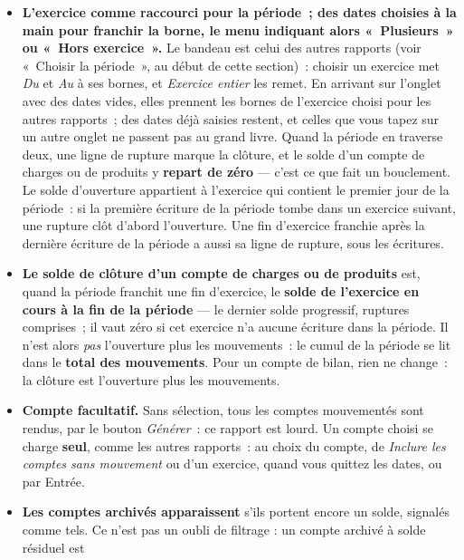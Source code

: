 \documentclass[a4paper,11pt,oneside]{article}
\begin{document}
\begin{itemize}
    \item \textbf{L'exercice comme raccourci pour la période~; des dates choisies à la main pour
          franchir la borne, le menu indiquant alors «~Plusieurs~» ou «~Hors exercice~».} Le bandeau
          est celui des autres rapports (voir «~Choisir la période~», au début de cette section)~:
          choisir un exercice met \emph{Du} et \emph{Au} à ses bornes, et \emph{Exercice entier}
          les remet. En arrivant sur l'onglet avec des dates vides, elles prennent les bornes de
          l'exercice choisi pour les autres rapports~; des dates déjà saisies restent, et celles
          que vous tapez sur un autre onglet ne passent pas au grand livre. Quand la période en traverse deux, une
          ligne de rupture marque la clôture, et le solde d'un compte de charges ou de produits
          y \textbf{repart de zéro} — c'est ce que fait un bouclement. Le solde d'ouverture
          appartient à l'exercice qui contient le premier jour de la période~: si la première
          écriture de la période tombe dans un exercice suivant, une rupture clôt d'abord
          l'ouverture. Une fin d'exercice franchie après la dernière écriture de la période a
          aussi sa ligne de rupture, sous les écritures.
    \item \textbf{Le solde de clôture d'un compte de charges ou de produits} est, quand la
          période franchit une fin d'exercice, le \textbf{solde de l'exercice en cours à la fin
          de la période} --- le dernier solde progressif, ruptures comprises~; il vaut zéro si
          cet exercice n'a aucune écriture dans la période. Il n'est alors \emph{pas} l'ouverture
          plus les mouvements~: le cumul de la période se lit dans le \textbf{total des
          mouvements}. Pour un compte de bilan, rien ne change~: la clôture est l'ouverture plus
          les mouvements.
    \item \textbf{Compte facultatif.} Sans sélection, tous les comptes mouvementés sont rendus,
          par le bouton \emph{Générer}~: ce rapport est lourd. Un compte choisi se charge
          \textbf{seul}, comme les autres rapports~: au choix du compte, de \emph{Inclure les comptes
          sans mouvement} ou d'un exercice, quand vous quittez les dates, ou par Entrée.
    \item \textbf{Les comptes archivés apparaissent} s'ils portent encore un solde, signalés
          comme tels. Ce n'est pas un oubli de filtrage : un compte archivé à solde résiduel est

\end{itemize}
\end{document}
